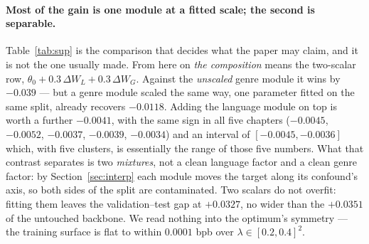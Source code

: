 \documentclass[10pt,twocolumn,a4paper]{article}
\begin{document}
\paragraph{Most of the gain is one module at a fitted scale; the second is
separable.} Table~\ref{tab:sup} is the comparison that decides what the paper
may claim, and it is not the one usually made. From here on \emph{the
composition} means the two-scalar row, $\theta_0+0.3\,\Delta W_L+0.3\,\Delta
W_G$. Against the \emph{unscaled} genre module it wins by $-0.039$ --- but a genre module scaled the same
way, one parameter fitted on the same split, already recovers $-0.0118$. Adding
the language module on top is worth a further $-0.0041$, with the same sign in
all five chapters ($-0.0045$, $-0.0052$, $-0.0037$, $-0.0039$, $-0.0034$) and an
interval of $[-0.0045,-0.0036]$ which, with five clusters, is essentially the
range of those five numbers. What that contrast separates is two \emph{mixtures},
not a clean language factor and a clean genre factor: by
Section~\ref{sec:interp} each module moves the target along its confound's axis,
so both sides of the split are contaminated. Two scalars do not overfit: fitting them leaves the
validation--test gap at $+0.0327$, no wider than the $+0.0351$ of the untouched
backbone. We read nothing into the
optimum's symmetry --- the training surface is flat to within $0.0001$ bpb over
$\lambda\in[0.2,0.4]^2$.
\end{document}

